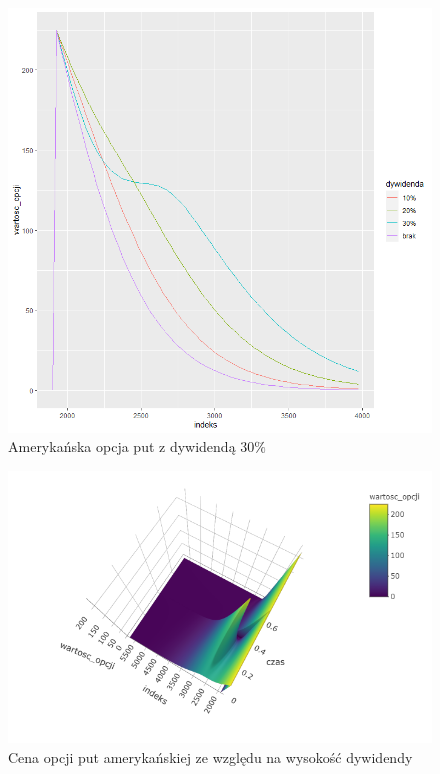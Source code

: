 \documentclass[12pt]{article}
\begin{document}
\begin{figure}[H]
    \centering
    \includegraphics[width=\textwidth,height=\textheight,keepaspectratio]{dividend/zmiennosc_dywidendy_put_A.png}
    \caption{Amerykańska opcja put z dywidendą $30\%$}
    \label{fig:divi_30}
\end{figure}

\begin{figure}[H]
    \centering
    \includegraphics[width=\textwidth,height=\textheight,keepaspectratio]{dividend/dywidenda_30.png}
    \caption{Cena opcji put amerykańskiej ze względu na wysokość dywidendy}
    \label{fig:divi_wysokosc_put_A}
\end{figure}
\end{document}

